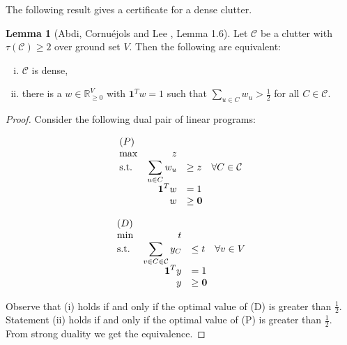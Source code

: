 \documentclass[a4paper, 12pt]{scrbook}
\theoremstyle{definition}
\newtheorem{lemma}[theorem]{Lemma}
\newcommand*{\IR}{\ensuremath{\mathbb{R}}}
\begin{document}
The following result gives a certificate for a dense clutter.
\begin{lemma}[Abdi, Cornuéjols and Lee \cite{restrictions}, Lemma 1.6]\label{certificate}
    Let $\mathcal{C}$ be a clutter with $\tau(\mathcal{C})\geq 2$ over ground set $V$.
    Then the following are equivalent:
    \leavevmode
    \begin{enumerate}[(i)]
        \item $\mathcal{C}$ is dense,
        \item there is a $w \in \IR_{\geq 0}^V$ with $\textbf{1}^Tw=1$ such that $\sum_{u \in C} w_u > \frac 12$ for all $C \in \mathcal{C}$.
    \end{enumerate}
\end{lemma}

\begin{proof}
    Consider the following dual pair of linear programs:

    \begin{minipage}{.4\textwidth}
        \centering
        \begin{equation*}
            \begin{array}{l@{\quad} r l l}
                (P)\\
                \max          &z   \\
                \mathrm{s.t.}  &\displaystyle\sum\limits_{u\in C} w_u &\geq  z \quad \forall C \in \mathcal{C} \\
                    & \textbf{1}^Tw &=   1 \\
                    &   w &\geq   \textbf{0}
            \end{array}
        \end{equation*}
    \end{minipage}
    \begin{minipage}{.4\textwidth}
        \centering
        \begin{equation*}
            \begin{array}{l@{\quad} r l l}
                (D)\\
                \min          &t   \\
                \mathrm{s.t.}  &\displaystyle\sum\limits_{v \in C \in \mathcal{C}} y_C &\leq  t \quad \forall v \in V \\
                    & \textbf{1}^Ty &=   1 \\
                    &   y &\geq   \textbf{0}
            \end{array}
        \end{equation*}
    \end{minipage}

    \vspace{1cm}
    Observe that (i) holds if and only if the optimal value of (D) is greater than $\frac 12$. Statement (ii) holds if and only if the optimal value of (P) is greater than $\frac 12$.
    From strong duality we get the equivalence.
\end{proof}
\end{document}
